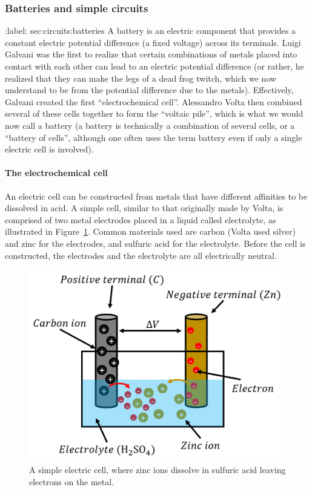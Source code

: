 \subsubsection{Batteries and simple circuits}

:label: sec:circuits:batteries
A battery is an electric component that provides a constant electric potential difference (a fixed voltage) across its terminals. Luigi Galvani was the first to realize that certain combinations of metals placed into contact with each other can lead to an electric potential difference (or rather, he realized that they can make the legs of a dead frog twitch, which we now understand to be from the potential difference due to the metals). Effectively, Galvani created the first ``electrochemical cell''. Alessandro Volta then combined several of these cells together to form the ``voltaic pile'', which is what we would now call a battery (a battery is technically a combination of several cells, or a ``battery of cells'', although one often uses the term battery even if only a single electric cell is involved).

\paragraph{The electrochemical cell}

An electric cell can be constructed from metals that have different affinities to be dissolved in acid. A simple cell, similar to that originally made by Volta, is comprised of two metal electrodes placed in a liquid called electrolyte, as illustrated in Figure~\ref{fig:circuits:electriccell}. Common materials used are carbon (Volta used silver) and zinc for the electrodes, and sulfuric acid for the electrolyte. Before the cell is constructed, the electrodes and the electrolyte are all electrically neutral.

\begin{figure}[!htbp]
\centering
\includegraphics[width=0.7\linewidth]{files/electriccell-b624e62206c62803c9f633d00bae9bb0.png}
\caption[]{A simple electric cell, where zinc ions dissolve in sulfuric acid leaving electrons on the metal.}
\label{fig:circuits:electriccell}
\end{figure}

